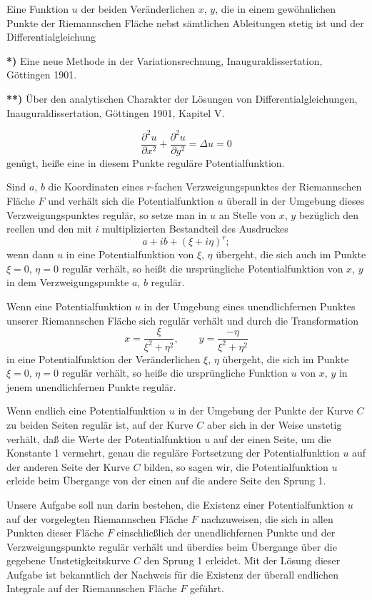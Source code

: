 \documentclass{article}
\begin{document}
Eine Funktion $u$ der beiden Veränderlichen $x$, $y$, die in einem gewöhnlichen Punkte der Riemannschen Fläche nebst sämtlichen Ableitungen stetig ist und der Differentialgleichung

\textbf{*)} Eine neue Methode in der Variationsrechnung, Inauguraldissertation, Göttingen 1901.

\textbf{**)} Über den analytischen Charakter der Lösungen von Differentialgleichungen, Inauguraldissertation, Göttingen 1901, Kapitel V.

\[
\frac{\partial^2 u}{\partial x^2} + \frac{\partial^2 u}{\partial y^2} = \Delta u = 0
\]
genügt, heiße eine in diesem Punkte reguläre Potentialfunktion.

Sind $a$, $b$ die Koordinaten eines $r$-fachen Verzweigungspunktes der Riemannschen Fläche $F$ und verhält sich die Potentialfunktion $u$ überall in der Umgebung dieses Verzweigungspunktes regulär, so setze man in $u$ an Stelle von $x$, $y$ bezüglich den reellen und den mit $i$ multiplizierten Bestandteil des Ausdruckes
\[
a + ib + (\xi + i\eta)^r;
\]
wenn dann $u$ in eine Potentialfunktion von $\xi$, $\eta$ übergeht, die sich auch im Punkte $\xi = 0$, $\eta = 0$ regulär verhält, so heißt die ursprüngliche Potentialfunktion von $x$, $y$ in dem Verzweigungspunkte $a$, $b$ regulär.

Wenn eine Potentialfunktion $u$ in der Umgebung eines unendlichfernen Punktes unserer Riemannschen Fläche sich regulär verhält und durch die Transformation
\[
x = \frac{\xi}{\xi^2 + \eta^2}, \qquad y = \frac{-\eta}{\xi^2 + \eta^2}
\]
in eine Potentialfunktion der Veränderlichen $\xi$, $\eta$ übergeht, die sich im Punkte $\xi = 0$, $\eta = 0$ regulär verhält, so heiße die ursprüngliche Funktion $u$ von $x$, $y$ in jenem unendlichfernen Punkte regulär.

Wenn endlich eine Potentialfunktion $u$ in der Umgebung der Punkte der Kurve $C$ zu beiden Seiten regulär ist, auf der Kurve $C$ aber sich in der Weise unstetig verhält, daß die Werte der Potentialfunktion $u$ auf der einen Seite, um die Konstante 1 vermehrt, genau die reguläre Fortsetzung der Potentialfunktion $u$ auf der anderen Seite der Kurve $C$ bilden, so sagen wir, die Potentialfunktion $u$ erleide beim Übergange von der einen auf die andere Seite den Sprung 1.

Unsere Aufgabe soll nun darin bestehen, die Existenz einer Potentialfunktion $u$ auf der vorgelegten Riemannschen Fläche $F$ nachzuweisen, die sich in allen Punkten dieser Fläche $F$ einschließlich der unendlichfernen Punkte und der Verzweigungspunkte regulär verhält und überdies beim Übergange über die gegebene Unstetigkeitskurve $C$ den Sprung 1 erleidet. Mit der Lösung dieser Aufgabe ist bekanntlich der Nachweis für die Existenz der überall endlichen Integrale auf der Riemannschen Fläche $F$ geführt.
\end{document}
